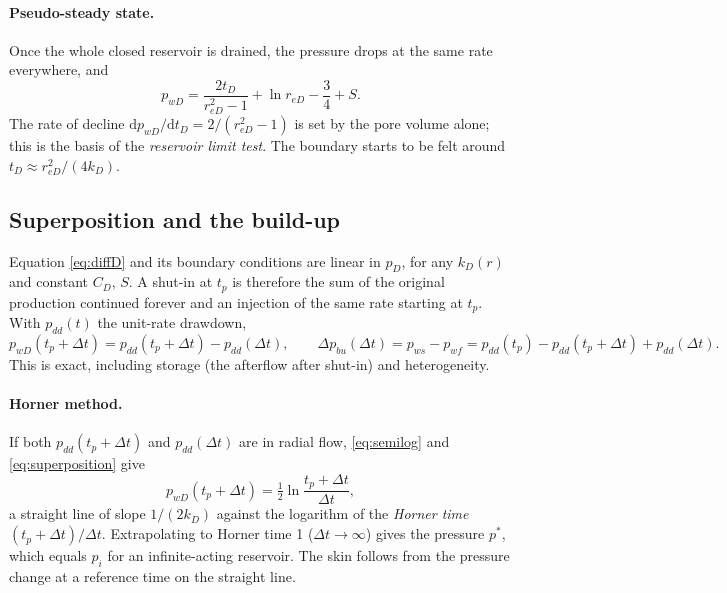 \documentclass[11pt]{article}
\newcommand{\dd}{\mathrm{d}}
\newcommand{\reD}{r_{eD}}
\begin{document}
\paragraph{Pseudo-steady state.} Once the whole closed reservoir is drained, the pressure drops at the same rate
everywhere, and
\begin{equation}
  p_{wD} = \frac{2 t_D}{\reD^2 - 1} + \ln \reD - \frac34 + S .
  \label{eq:pss}
\end{equation}
The rate of decline $\dd p_{wD}/\dd t_D = 2/(\reD^2-1)$ is set by the pore volume alone; this is the basis of the
\emph{reservoir limit test}. The boundary starts to be felt around $t_D \approx \reD^2/(4 k_D)$.

\subsection{Superposition and the build-up}

Equation \eqref{eq:diffD} and its boundary conditions are linear in $p_D$, for any $k_D(r)$ and constant $C_D$,
$S$. A shut-in at $t_p$ is therefore the sum of the original production continued forever and an injection of the
same rate starting at $t_p$. With $p_{dd}(t)$ the unit-rate drawdown,
\begin{equation}
  p_{wD}(t_p + \Delta t) = p_{dd}(t_p + \Delta t) - p_{dd}(\Delta t), \qquad
  \Delta p_{bu}(\Delta t) = p_{ws} - p_{wf} = p_{dd}(t_p) - p_{dd}(t_p + \Delta t) + p_{dd}(\Delta t).
  \label{eq:superposition}
\end{equation}
This is exact, including storage (the afterflow after shut-in) and heterogeneity.

\paragraph{Horner method.} If both $p_{dd}(t_p + \Delta t)$ and $p_{dd}(\Delta t)$ are in radial flow,
\eqref{eq:semilog} and \eqref{eq:superposition} give
\begin{equation}
  p_{wD}(t_p+\Delta t) = \tfrac12 \ln\frac{t_p + \Delta t}{\Delta t},
  \label{eq:horner}
\end{equation}
a straight line of slope $1/(2k_D)$ against the logarithm of the \emph{Horner time} $(t_p+\Delta t)/\Delta t$.
Extrapolating to Horner time 1 ($\Delta t \to \infty$) gives the pressure $p^*$, which equals $p_i$ for an
infinite-acting reservoir. The skin follows from the pressure change at a reference time on the straight line.
\end{document}
